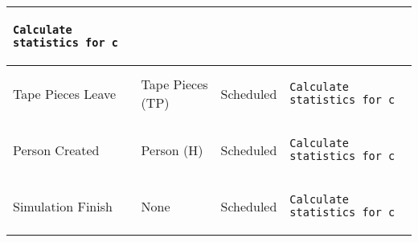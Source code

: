 \begin{longtable}{@{}>{\raggedright\arraybackslash}p{1.5cm}>{\raggedright\arraybackslash}p{2.1cm}>{\raggedright\arraybackslash}p{2.2cm}>{\raggedright\arraybackslash}p{10cm}@{}}
\begin{lstlisting}[language=CMPseudo]
Calculate statistics for c
  \end{lstlisting}
  \\ \midrule
  Tape Pieces Leave & Tape Pieces (TP)  & Scheduled  & 
  \begin{lstlisting}[language=CMPseudo]
Calculate statistics for c
  \end{lstlisting}
  \\ \midrule
  Person Created & Person (H)  & Scheduled  & 
  \begin{lstlisting}[language=CMPseudo]
Calculate statistics for c
  \end{lstlisting}
  \\ \midrule
  Simulation Finish & None  & Scheduled  & 
  \begin{lstlisting}[language=CMPseudo]
Calculate statistics for c
  \end{lstlisting}
  \\ \bottomrule
  \end{longtable}